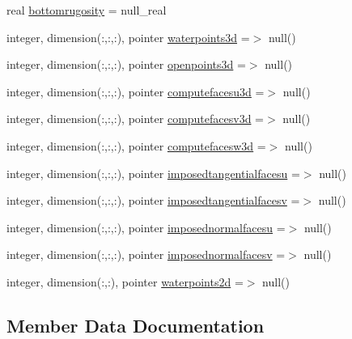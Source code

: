 \begin{DoxyCompactItemize}
\item 
real \mbox{\hyperlink{structmoduleturbulence_1_1t__external_aefad9958df3a7179c3f135b15389cba0}{bottomrugosity}} = null\+\_\+real
\item 
integer, dimension(\+:,\+:,\+:), pointer \mbox{\hyperlink{structmoduleturbulence_1_1t__external_a7bb989c1d4ac96de7b2c6d8727cd183e}{waterpoints3d}} =$>$ null()
\item 
integer, dimension(\+:,\+:,\+:), pointer \mbox{\hyperlink{structmoduleturbulence_1_1t__external_a6d5eee5625f1955d41e7f057011e45ae}{openpoints3d}} =$>$ null()
\item 
integer, dimension(\+:,\+:,\+:), pointer \mbox{\hyperlink{structmoduleturbulence_1_1t__external_afc150545dd87085e6925366c89826c96}{computefacesu3d}} =$>$ null()
\item 
integer, dimension(\+:,\+:,\+:), pointer \mbox{\hyperlink{structmoduleturbulence_1_1t__external_a8fb38c24c9172a1091ac65370bc1cd84}{computefacesv3d}} =$>$ null()
\item 
integer, dimension(\+:,\+:,\+:), pointer \mbox{\hyperlink{structmoduleturbulence_1_1t__external_a3677c379bd41ce3dc7b3c39d4f405d12}{computefacesw3d}} =$>$ null()
\item 
integer, dimension(\+:,\+:,\+:), pointer \mbox{\hyperlink{structmoduleturbulence_1_1t__external_a218303fd077909c692032bff4b04d228}{imposedtangentialfacesu}} =$>$ null()
\item 
integer, dimension(\+:,\+:,\+:), pointer \mbox{\hyperlink{structmoduleturbulence_1_1t__external_ae3d041b1c786888b0abd889ebc960ace}{imposedtangentialfacesv}} =$>$ null()
\item 
integer, dimension(\+:,\+:,\+:), pointer \mbox{\hyperlink{structmoduleturbulence_1_1t__external_aa727b6c9194ece22d306f2d366f1bdb0}{imposednormalfacesu}} =$>$ null()
\item 
integer, dimension(\+:,\+:,\+:), pointer \mbox{\hyperlink{structmoduleturbulence_1_1t__external_ad6508820fbbe7cd62f21669ac53cf292}{imposednormalfacesv}} =$>$ null()
\item 
integer, dimension(\+:,\+:), pointer \mbox{\hyperlink{structmoduleturbulence_1_1t__external_ad64786e7700802cdb87b6f24f0e65f2b}{waterpoints2d}} =$>$ null()
\end{DoxyCompactItemize}


\subsection{Member Data Documentation}
\mbox{\label{structmoduleturbulence_1_1t__external_af36adf2c295d7186d5ee9af82557ef4b}} 
